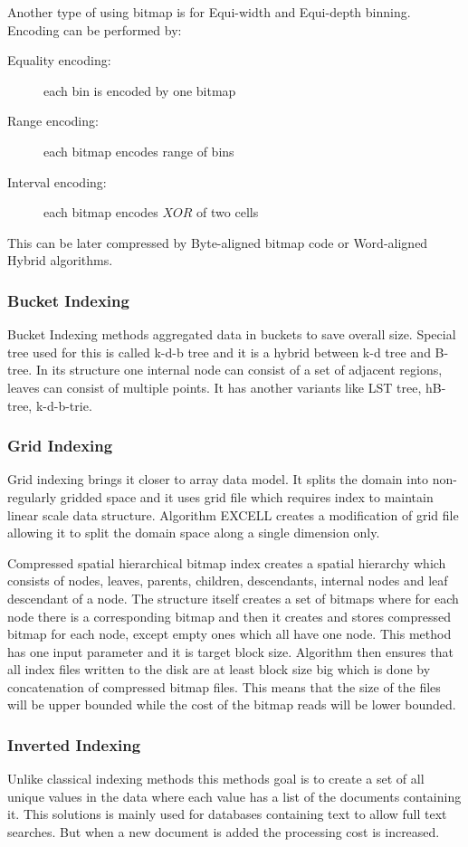 Another type of using bitmap is for Equi-width and Equi-depth binning. Encoding can be performed by:

\begin{description}
\item[Equality encoding:] each bin is encoded by one bitmap
\item[Range encoding: ] each bitmap encodes range of bins
\item[Interval encoding: ] each bitmap encodes $XOR$ of two cells
\end{description}

This can be later compressed by Byte-aligned bitmap code or Word-aligned Hybrid algorithms. 
\subsubsection{Bucket Indexing}
Bucket Indexing methods aggregated data in buckets to save overall size. Special tree used for this is called k-d-b tree and it is a hybrid between k-d tree and B-tree. In its structure one internal node can consist of a set of adjacent regions, leaves can consist of multiple points. It has another variants like LST tree, hB-tree, k-d-b-trie.
\subsubsection{Grid Indexing}
Grid indexing brings it closer to array data model. It splits the domain into non-regularly gridded space and it uses grid file which requires index to maintain linear scale data structure. Algorithm EXCELL creates a modification of grid file allowing it to split the domain space along a single dimension only.

Compressed spatial hierarchical bitmap index \cite{cSHB} creates a spatial hierarchy which consists of nodes, leaves, parents, children, descendants, internal nodes and leaf descendant of a node. The structure itself creates a set of bitmaps where for each node there is a corresponding bitmap and then it creates and stores compressed bitmap for each node, except empty ones which all have one node. This method has one input parameter and it is target block size. Algorithm then ensures that all index files written to the disk are at least block size big which is done by concatenation of compressed bitmap files. This means that the size of the files will be upper bounded while the cost of the bitmap reads will be lower bounded.

\subsubsection{Inverted Indexing}
Unlike classical indexing methods this methods goal is to create a set of all unique values in the data where each value has a list of the documents containing it. This solutions is mainly used for databases containing text to allow full text searches. But when a new document is added the processing cost is increased. \cite{invertIndex}


